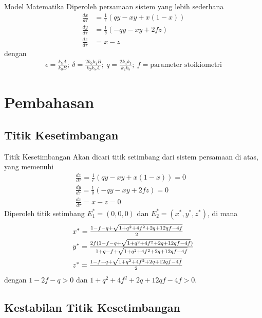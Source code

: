 \documentclass[aspectratio=169]{beamer}
\begin{document}
\begin{frame}{Model Matematika}
    Diperoleh persamaan sistem yang lebih sederhana
    \begin{align*}
        \frac{dx}{d\tau} &= \frac{1}{\epsilon} (qy - xy + x(1-x))\\
        \frac{dy}{d\tau} &= \frac{1}{\delta} (-qy - xy + 2fz)\\
    \frac{dz}{d\tau} &= x-z
    \end{align*}
    dengan 
    \begin{align*}
        \epsilon = \frac{k_5 A}{k_0 B}; \ \delta = \frac{2k_0 k_4 B}{k_2 k_5 A}; \ q = \frac{2k_4 k_3}{k_2 k_5}; \ f = \text{parameter stoikiometri}
    \end{align*}
\end{frame}
\section{Pembahasan}

\subsection{Titik Kesetimbangan}

\begin{frame}{Titik Kesetimbangan}
    Akan dicari titik setimbang dari sistem persamaan di atas, yang memenuhi
    \begin{align*}
        \tfrac{dx}{d\tau} = \tfrac{1}{\epsilon} (qy - xy + x(1-x)) = 0 & \\ 
        \tfrac{dy}{d\tau} = \tfrac{1}{\delta} (-qy - xy + 2fz) = 0 & \\ 
        \tfrac{dx}{d\tau} = x-z = 0 & 
    \end{align*}
    Diperoleh titik setimbang $E_1^*=(0,0,0)$ dan $E_2^*=(x^*,y^*,z^*)$, di mana 
    \begin{align}
        & x^* = \tfrac{1-f-q+\sqrt{1+q^2+4f^2+2q+12qf-4f}}{2}  \notag \\
        & y^* = \tfrac{2f(1-f-q+\sqrt{1+q^2+4f^2+2q+12qf-4f})}{1+q-f+\sqrt{1+q^2+4f^2+2q+12qf-4f}}  \notag \\
        & z^* = \tfrac{1-f-q+\sqrt{1+q^2+4f^2+2q+12qf-4f}}{2} \notag
    \end{align}
    dengan $1-2f-q>0$ dan $1+q^2+4f^2+2q+12qf-4f>0$.
\end{frame}

\subsection{Kestabilan Titik Kesetimbangan}
\end{document}

